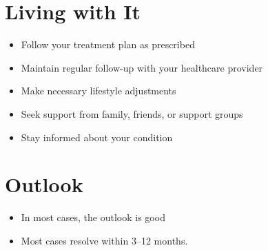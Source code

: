 \section{Living with It}
\begin{itemize}[noitemsep]
  \item Follow your treatment plan as prescribed
  \item Maintain regular follow-up with your healthcare provider
  \item Make necessary lifestyle adjustments
  \item Seek support from family, friends, or support groups
  \item Stay informed about your condition
\end{itemize}
\section{Outlook}
\begin{itemize}[noitemsep]
  \item In most cases, the outlook is good
  \item Most cases resolve within 3--12 months.
\end{itemize}
